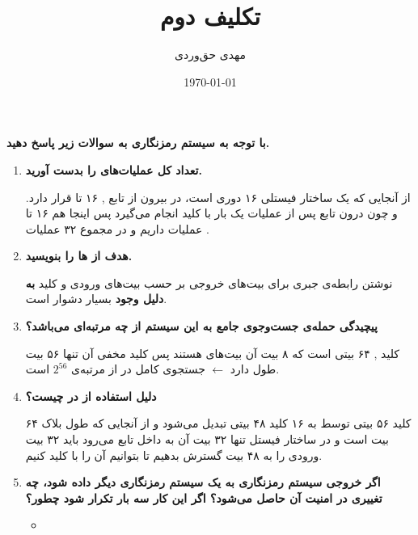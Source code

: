 \documentclass[dvipsnames, svgnames, x11names]{article}
\title{تکلیف دوم}
\author{مهدی حق‌وردی}
\date{\today}
\begin{document}
\maketitle
\tableofcontents

\section{}
\textbf{{\large با توجه به سیستم رمزنگاری  به سوالات زیر پاسخ دهید.}}

\begin{enumerate}[label=\alph*)]
\item 
\textbf{تعداد کل عملیات‌های 
را بدست آورید.}

از آنجایی که 
یک ساختار فیستلی ۱۶ دوری است، در بیرون از تابع 
,
۱۶ تا 
قرار دارد. و چون درون تابع
پس از عملیات 
یک بار با کلید 
انجام می‌گیرد پس اینجا هم ۱۶ تا عملیات 
داریم و در مجموع ۳۲ عملیات 
.

\item 
\textbf{هدف از 
ها
را بنویسید.}

نوشتن رابطه‌ی جبری برای بیت‌‌های خروجی بر حسب بیت‌های ورودی و کلید \textbf{به دلیل وجود } بسیار دشوار است.

\item 
\textbf{پیچیدگی حمله‌ی جست‌وجوی جامع به این سیستم از چه مرتبه‌ای می‌باشد؟}

کلید 
,
۶۴ بیتی است که ۸ بیت آن بیت‌های 
هستند پس کلید مخفی آن تنها ۵۶ بیت طول دارد $\leftarrow$ جستجوی کامل در 
از مرتبه‌ی 
$2^{56}$
است.

\item 
\textbf{دلیل استفاده از 
در 
چیست؟}

کلید ۵۶ بیتی 
توسط 
به ۱۶ کلید ۴۸ بیتی تبدیل می‌شود و از آنجایی که طول بلاک 
۶۴ بیت است و در ساختار فیستل تنها ۳۲ بیت آن به داخل تابع 
می‌رود باید ۳۲ بیت ورودی را به ۴۸ بیت گسترش بدهیم تا بتوانیم آن را با کلید 
کنیم.

\item 
\textbf{اگر خروجی سیستم رمزنگاری به یک سیستم رمزنگاری دیگر داده شود، چه تغییری در
امنیت آن حاصل می‌شود؟  اگر این کار سه بار تکرار شود
چطور؟ 
}

\begin{itemize}
\item {}


\end{itemize}
\end{enumerate}
\end{document}
